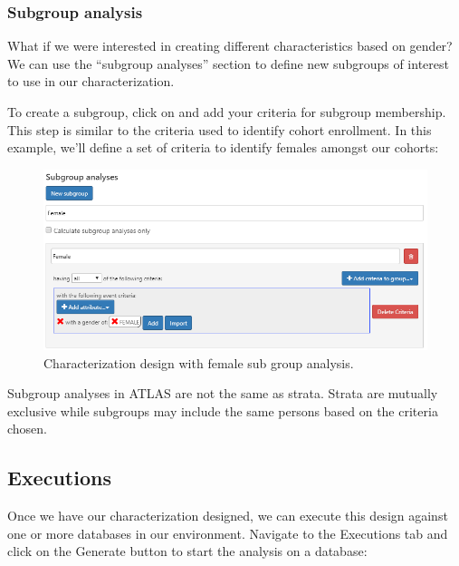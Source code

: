\documentclass[11pt]{book}
\theoremstyle{definition}
\theoremstyle{definition}
\theoremstyle{definition}
\theoremstyle{remark}
\let\BeginKnitrBlock\begin \let\EndKnitrBlock\end
\begin{document}
\hypertarget{subgroup-analysis}{%
\subsubsection*{Subgroup analysis}\label{subgroup-analysis}}

What if we were interested in creating different characteristics based on gender? We can use the ``subgroup analyses'' section to define new subgroups of interest to use in our characterization.

To create a subgroup, click on and add your criteria for subgroup membership. This step is similar to the criteria used to identify cohort enrollment. In this example, we'll define a set of criteria to identify females amongst our cohorts:

\begin{figure}

{\centering \includegraphics[width=1\linewidth]{images/Characterization/atlasCharacterizationSubgroup} 

}

\caption{Characterization design with female sub group analysis.}\label{fig:atlasCharacterizationSubgroup}
\end{figure}

\BeginKnitrBlock{rmdimportant}
Subgroup analyses in ATLAS are not the same as strata. Strata are mutually exclusive while subgroups may include the same persons based on the criteria chosen.
\EndKnitrBlock{rmdimportant}

\hypertarget{executions}{%
\subsection{Executions}\label{executions}}

Once we have our characterization designed, we can execute this design against one or more databases in our environment. Navigate to the Executions tab and click on the Generate button to start the analysis on a database:
\end{document}
